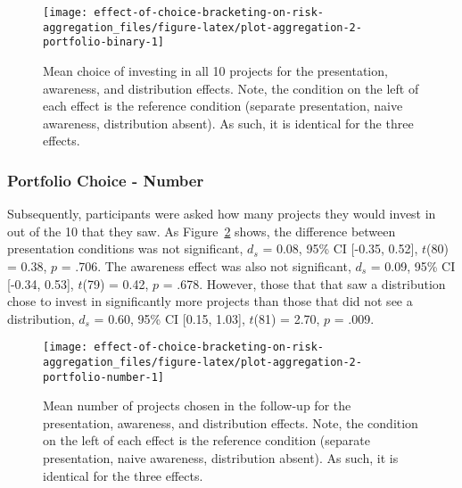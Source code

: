 \documentclass[
  english,
  man, donotrepeattitle,floatsintext]{apa7}
\theoremstyle{definition}
\theoremstyle{definition}
\theoremstyle{definition}
\theoremstyle{definition}
\theoremstyle{remark}
\begin{document}
\begin{figure}
\texttt{[image: effect-of-choice-bracketing-on-risk-aggregation\_files/figure-latex/plot-aggregation-2-portfolio-binary-1]} \caption{Mean choice of investing in all 10 projects for the presentation, awareness, and distribution effects. Note, the condition on the left of each effect is the reference condition (separate presentation, naive awareness, distribution absent). As such, it is identical for the three effects.}\label{fig:plot-aggregation-2-portfolio-binary}
\end{figure}

\hypertarget{portfolio-choice---number}{%
\subsubsection{Portfolio Choice - Number}\label{portfolio-choice---number}}

Subsequently, participants were asked how many projects they would invest in out
of the 10 that they saw. As
Figure~\ref{fig:plot-aggregation-2-portfolio-number} shows, the difference
between presentation conditions was not significant,
\(d_s\) = 0.08, 95\% CI {[}-0.35, 0.52{]}, \(t\)(80) = 0.38, \(p\) = .706. The awareness effect
was also not significant, \(d_s\) = 0.09, 95\% CI {[}-0.34, 0.53{]}, \(t\)(79) = 0.42, \(p\) = .678.
However, those that that saw a distribution chose to invest in significantly
more projects than those that did not see a distribution,
\(d_s\) = 0.60, 95\% CI {[}0.15, 1.03{]}, \(t\)(81) = 2.70, \(p\) = .009.



\begin{figure}
\texttt{[image: effect-of-choice-bracketing-on-risk-aggregation\_files/figure-latex/plot-aggregation-2-portfolio-number-1]} \caption{Mean number of projects chosen in the follow-up for the presentation, awareness, and distribution effects. Note, the condition on the left of each effect is the reference condition (separate presentation, naive awareness, distribution absent). As such, it is identical for the three effects.}\label{fig:plot-aggregation-2-portfolio-number}
\end{figure}
\end{document}
